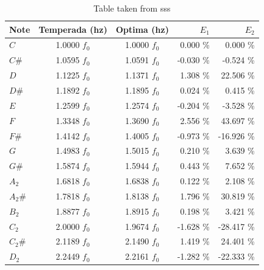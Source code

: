 \documentclass{article}
\begin{document}
\begin{table}[h]
\center
\begin{tabular}{|l||c|c||r|r|}
\hline 
Note & Temperada (hz)& Optima (hz) & $E_1$ & $E_2$ \\ \hline
\hline 
    $C$ & 1.0000 $f_0$ & 1.0000 $f_0$ &  0.000 \% &   0.000 \% \\ \hline 
  $C\#$ & 1.0595 $f_0$ & 1.0591 $f_0$ & -0.030 \% &  -0.524 \% \\ \hline 
    $D$ & 1.1225 $f_0$ & 1.1371 $f_0$ &  1.308 \% &  22.506 \% \\ \hline 
  $D\#$ & 1.1892 $f_0$ & 1.1895 $f_0$ &  0.024 \% &   0.415 \% \\ \hline 
    $E$ & 1.2599 $f_0$ & 1.2574 $f_0$ & -0.204 \% &  -3.528 \% \\ \hline 
    $F$ & 1.3348 $f_0$ & 1.3690 $f_0$ &  2.556 \% &  43.697 \% \\ \hline 
  $F\#$ & 1.4142 $f_0$ & 1.4005 $f_0$ & -0.973 \% & -16.926 \% \\ \hline 
    $G$ & 1.4983 $f_0$ & 1.5015 $f_0$ &  0.210 \% &   3.639 \% \\ \hline 
  $G\#$ & 1.5874 $f_0$ & 1.5944 $f_0$ &  0.443 \% &   7.652 \% \\ \hline 
  $A_2$ & 1.6818 $f_0$ & 1.6838 $f_0$ &  0.122 \% &   2.108 \% \\ \hline 
$A_2\#$ & 1.7818 $f_0$ & 1.8138 $f_0$ &  1.796 \% &  30.819 \% \\ \hline 
  $B_2$ & 1.8877 $f_0$ & 1.8915 $f_0$ &  0.198 \% &   3.421 \% \\ \hline 
  $C_2$ & 2.0000 $f_0$ & 1.9674 $f_0$ & -1.628 \% & -28.417 \% \\ \hline 
$C_2\#$ & 2.1189 $f_0$ & 2.1490 $f_0$ &  1.419 \% &  24.401 \% \\ \hline 
  $D_2$ & 2.2449 $f_0$ & 2.2161 $f_0$ & -1.282 \% & -22.333 \% \\ \hline 
\end{tabular}
\vspace{5pt}
\caption{Table taken from sss}
\label{table:res}
\end{table}
\end{document}
